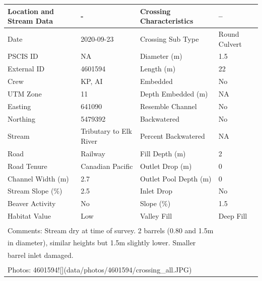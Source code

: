 \documentclass[
]{book}
\begin{document}
\begin{tabular}{l|l|l|l}
\hline
Location and Stream Data & - & Crossing Characteristics & --\\
\hline
Date & 2020-09-23 & Crossing Sub Type & Round Culvert\\
\hline
PSCIS ID & NA & Diameter (m) & 1.5\\
\hline
External ID & 4601594 & Length (m) & 22\\
\hline
Crew & KP, AI & Embedded & No\\
\hline
UTM Zone & 11 & Depth Embedded (m) & NA\\
\hline
Easting & 641090 & Resemble Channel & No\\
\hline
Northing & 5479392 & Backwatered & No\\
\hline
Stream & Tributary to Elk River & Percent Backwatered & NA\\
\hline
Road & Railway & Fill Depth (m) & 2\\
\hline
Road Tenure & Canadian Pacific & Outlet Drop (m) & 0\\
\hline
Channel Width (m) & 2.7 & Outlet Pool Depth (m) & 0\\
\hline
Stream Slope (\%) & 2.5 & Inlet Drop & No\\
\hline
Beaver Activity & No & Slope (\%) & 1.5\\
\hline
Habitat Value & Low & Valley Fill & Deep Fill\\
\hline
\multicolumn{4}{l}{\textsuperscript{} Comments: Stream dry at time of survey. 2 barrels (0.80 and 1.5m}\\
\multicolumn{4}{l}{in diameter), similar heights but 1.5m slightly lower. Smaller}\\
\multicolumn{4}{l}{barrel inlet damaged.}\\
\multicolumn{4}{l}{\textsuperscript{} Photos: 4601594![](data/photos/4601594/crossing\_all.JPG)}\\
\end{tabular}
\end{document}
